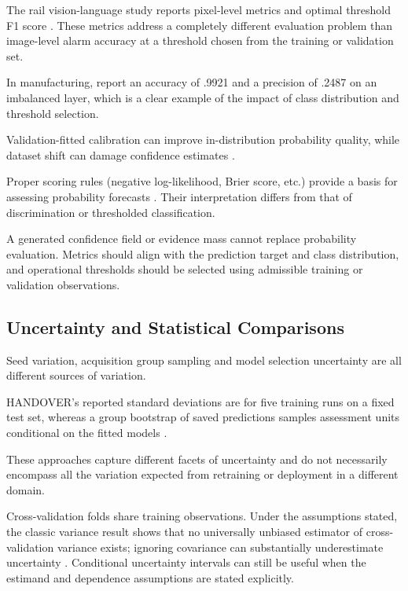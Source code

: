 The rail vision-language study reports pixel-level metrics and optimal threshold F1 score \parencite[Section~IV.B.2]{P031}. These metrics address a completely different evaluation problem than image-level alarm
accuracy at a threshold chosen from the training or validation set.

In manufacturing, \textcite{Petrich2021Multimodal} report an accuracy of .9921 and a precision of .2487 on an
imbalanced layer, which is a clear example of the impact of class distribution and threshold
selection.

Validation-fitted calibration can improve in-distribution probability quality, while dataset shift
can damage confidence estimates \parencite{Guo2017Calibration,P008}.

Proper scoring rules (negative log-likelihood, Brier score, etc.) provide a basis for assessing
probability forecasts \parencite{P055}. Their interpretation differs from that of discrimination or
thresholded classification.

A generated confidence field or evidence mass cannot replace probability evaluation. Metrics should
align with the prediction target and class distribution, and operational thresholds should be
selected using admissible training or validation observations.

\subsection{Uncertainty and Statistical Comparisons}

Seed variation, acquisition group sampling and model selection uncertainty are all different sources
of variation.

HANDOVER's reported standard deviations are for five training runs on a fixed test set, whereas a
group bootstrap of saved predictions samples assessment units conditional on the fitted models
\parencite{Thoduka2024Handover}.

These approaches capture different facets of uncertainty and do not necessarily encompass all the
variation expected from retraining or deployment in a different domain.

Cross-validation folds share training observations. Under the assumptions stated, the classic
variance result shows that no universally unbiased estimator of cross-validation variance exists;
ignoring covariance can substantially underestimate uncertainty \parencite[pp.~1096--1098, 1102--1104]{Bengio2004CVVariance}. Conditional uncertainty intervals can still be useful when the
estimand and dependence assumptions are stated explicitly.

